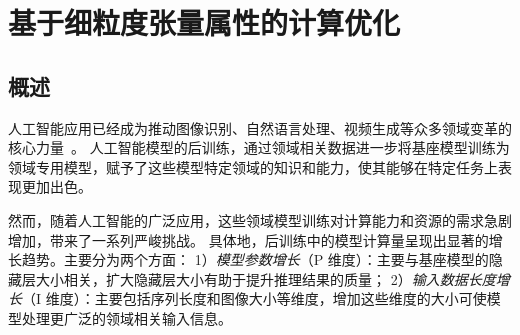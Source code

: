
\chapter{基于细粒度张量属性的计算优化}

\label{chap:flashtensor}

\section{概述}



人工智能应用已经成为推动图像识别、自然语言处理、视频生成等众多领域变革的核心力量~\cite{radford2018gpt, radford2019gpt2, brown2020gpt3, achiam2023gpt4, touvron2023llama, touvron2023llama2, roziere2023codellama, MosaicML2023mpt30b, jiang2023mistralv1, peng2023yarn}。
人工智能模型的后训练，通过领域相关数据进一步将基座模型训练为领域专用模型，赋予了这些模型特定领域的知识和能力，使其能够在特定任务上表现更加出色。

然而，随着人工智能的广泛应用，这些领域模型训练对计算能力和资源的需求急剧增加，带来了一系列严峻挑战。
具体地，后训练中的模型计算量呈现出显著的增长趋势。主要分为两个方面：
1）\textit{模型参数增长}（P 维度）：主要与基座模型的隐藏层大小相关，扩大隐藏层大小有助于提升推理结果的质量；
2）\textit{输入数据长度增长}（I 维度）：主要包括序列长度和图像大小等维度，增加这些维度的大小可使模型处理更广泛的领域相关输入信息。

